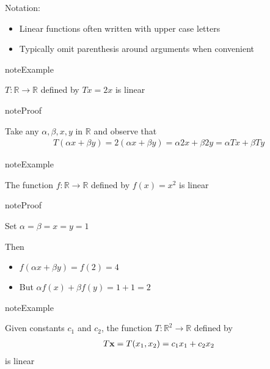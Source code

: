 \documentclass[letterpaper,10pt,english]{jupyterBook}
\begin{document}
\sphinxAtStartPar
Notation:
\begin{itemize}
\item {} 
\sphinxAtStartPar
Linear functions often written with upper case letters

\item {} 
\sphinxAtStartPar
Typically omit parenthesis around arguments when convenient

\end{itemize}

\begin{sphinxadmonition}{note}{Example}

\sphinxAtStartPar
\(T \colon \mathbb{R} \to \mathbb{R}\) defined by \(Tx = 2x\) is linear
\end{sphinxadmonition}

\begin{sphinxadmonition}{note}{Proof}

\sphinxAtStartPar
Take any \(\alpha, \beta, x, y\) in \(\mathbb{R}\) and observe that
\begin{equation*}
\begin{split}
%
T(\alpha x + \beta y)
= 2(\alpha x + \beta y)
= \alpha 2 x + \beta 2 y
= \alpha Tx + \beta Ty 
%
\end{split}
\end{equation*}\end{sphinxadmonition}

\begin{sphinxadmonition}{note}{Example}

\sphinxAtStartPar
The function \(f \colon \mathbb{R} \to \mathbb{R}\) defined by \(f(x) = x^2\) is
linear
\end{sphinxadmonition}

\begin{sphinxadmonition}{note}{Proof}

\sphinxAtStartPar
Set \(\alpha = \beta = x = y = 1\)

\sphinxAtStartPar
Then
\begin{itemize}
\item {} 
\sphinxAtStartPar
\(f(\alpha x + \beta y) = f(2) = 4\)

\item {} 
\sphinxAtStartPar
But \(\alpha f(x) + \beta f(y) = 1 + 1 = 2\)

\end{itemize}
\end{sphinxadmonition}

\begin{sphinxadmonition}{note}{Example}

\sphinxAtStartPar
Given constants \(c_1\) and \(c_2\), the
function \(T \colon \mathbb{R}^2 \to \mathbb{R}\) defined by
\begin{equation*}
\begin{split}
%
T {\bf x} = T (x_1, x_2) = c_1 x_1 + c_2 x_2 
%
\end{split}
\end{equation*}
\sphinxAtStartPar
is linear
\end{sphinxadmonition}
\end{document}
